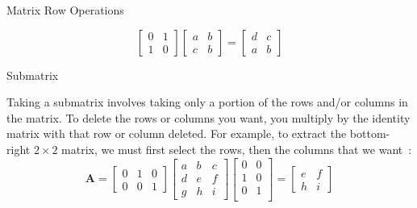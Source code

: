 \documentclass[aspectratio=169,xcolor=dvipsnames]{beamer}
\begin{document}
\begin{frame}{Matrix Row Operations}
\begin{enumerate}
{$$\begin{bmatrix}
                  0 & 1 \\
                  1 & 0
                \end{bmatrix} 
            \begin{bmatrix}
              a & b \\
              c & b
            \end{bmatrix}
            = 
            \begin{bmatrix}
                  d & c \\
                  a & b
                \end{bmatrix} 
            $$
            }
\end{enumerate}

\end{frame}

\begin{frame}{Submatrix}

Taking a submatrix involves taking only a portion of the rows and/or columns in
the matrix. To delete the rows or columns you want, you multiply by the identity
matrix with that row or column deleted.
For example, to extract the bottom-right $2 \times 2$ matrix, we must
first select the rows, then the columns that we want~\cite{mathse1322946}:
$$\mathbf{A} = 
\begin{bmatrix}
      0 & 1 & 0 \\
      0 & 0 & 1
\end{bmatrix} 
\begin{bmatrix}
  a & b & c \\
  d & e & f \\
  g & h & i
\end{bmatrix}
\begin{bmatrix}
      0 & 0 \\
      1 & 0 \\
      0 & 1 \\
\end{bmatrix} 
= 
\begin{bmatrix}
      e & f \\
      h & i
    \end{bmatrix} 
$$

\end{frame}


\end{document}
